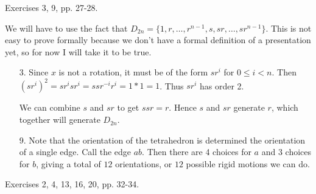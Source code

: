 \documentclass{article}
\begin{document}
Exercises 3, 9, pp. 27-28.

We will have to use the fact that $D_{2n} = \{1, r, \dots, r^{n-1}, s, sr, \dots, sr^{n-1}\}$. This is not easy to prove formally because we don't have a formal definition of a presentation yet, so for now I will take it to be true.

\begin{enumerate}
    \item [3.] Since $x$ is not a rotation, it must be of the form $sr^i$ for $0 \le i < n$. Then $(sr^i)^2 = sr^isr^i = ssr^{-i}r^i = 1 * 1 = 1$. Thus $sr^i$ has order 2. 
    
    We can combine $s$ and $sr$ to get $ssr = r$. Hence $s$ and $sr$ generate $r$, which together will generate $D_{2n}$.

    \item[9.] Note that the orientation of the tetrahedron is determined the orientation of a single edge. Call the edge $ab$. Then there are 4 choices for $a$ and $3$ choices for $b$, giving a total of $12$ orientations, or $12$ possible rigid motions we can do.

\end{enumerate}
Exercises 2, 4, 13, 16, 20, pp. 32-34.
\end{document}
